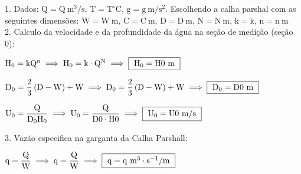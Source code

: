 \documentclass{article}
\newcommand{\myspace}{0.5cm}
\begin{document}

1. Dados: $\mathrm{Q = {{Q}} \ m^{3}/s}$, $\mathrm{T = {{T}} ^{\circ}C}$, $\mathrm{g = {{g}} \ m/s^{2}}$. Escolhendo a calha parshal com as seguintes dimensões: $\mathrm{W = {{W}} \ m}$, $\mathrm{C = {{C}} \ m}$,  $\mathrm{D = {{D}} \ m}$, $\mathrm{N = {{N}} \ m}$, $\mathrm{k = {{k}} }$, $\mathrm{n = {{n}} \ m}$ \\

2. Calculo da velocidade e da profundidade da água na seção de medição (seção 0):

\vspace{\myspace}

\begin{center}
	$
		\mathrm
		{
			H_{0} = kQ^{n}
		}
		\implies
		\mathrm
		{
			H_{0} = {{k}} \cdot {{Q}}^{ {{N}} }
		} 
		\implies 
		\fbox
		{ 
			$\mathrm
			{
				H_{0} = {{H0}} \ m
			}$
		} 
	$
\end{center}

\vspace{\myspace}

\begin{center}
	$
		\mathrm
		{
			D_{0} = \dfrac{2}{3} \left ( D - W \right ) + W
		} 
		\implies
		\mathrm
		{
			D_{0} = \dfrac{2}{3} \left ( {{D}} - {{W}} \right ) + {{W}}
		}
		\implies 
		\fbox
		{ 
			$\mathrm
			{	
				D_{0} = {{D0}} \ m
			}$
		} 
	$	
\end{center}

\vspace{\myspace}

\begin{center}
	$
		\mathrm
		{
			U_{0} = \dfrac{Q}{D_{0}H_{0}}
		} 		
		\implies 
		\mathrm
		{
			U_{0} = \dfrac{ {{Q}} }{ {{D0}} \cdot {{H0}} }
		}
		\implies 
		\fbox
		{ 
			$\mathrm
			{
				U_{0} = {{U0}} \ m/s
			}$
		}
	$  	
\end{center}

\vspace{\myspace}

3. Vazão especifica na garganta da Calha Parshall:

\vspace{\myspace}

\begin{center}
	$ 
		\mathrm
		{
			q = \dfrac{Q}{W}
		}
		\implies 
		\mathrm
		{
			q = \dfrac{ {{Q}} }{ {{W}} }			
		}
		\implies 
		\fbox
		{
		 	$\mathrm
		 	{	
		 		q = {{q}} \ m^{3}\cdot s^{-1}/m
		 	}$
		 }
	$
\end{center}
\end{document}
